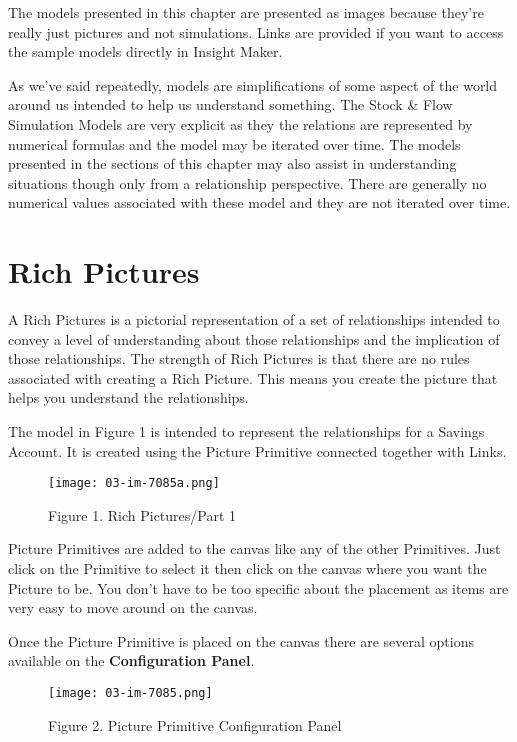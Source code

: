 \documentclass[]{memoir}
\let\Oldincludegraphics\includegraphics
\renewcommand{\includegraphics}[1]{\Oldincludegraphics[max size={\textwidth}{\textheight}]{#1}}
\renewcommand{\u}[1]{\textbf{#1}}
\begin{document}
The models presented in this chapter are presented as images because
they're really just pictures and not simulations. Links are provided if
you want to access the sample models directly in Insight Maker.

As we've said repeatedly, models are simplifications of some aspect of
the world around us intended to help us understand something. The Stock
\& Flow Simulation Models are very explicit as they the relations are
represented by numerical formulas and the model may be iterated over
time. The models presented in the sections of this chapter may also
assist in understanding situations though only from a relationship
perspective. There are generally no numerical values associated with
these model and they are not iterated over time.

\section{Rich Pictures}

A Rich Pictures is a pictorial representation of a set of relationships
intended to convey a level of understanding about those relationships
and the implication of those relationships. The strength of Rich
Pictures is that there are no rules associated with creating a Rich
Picture. This means you create the picture that helps you understand the
relationships.

The model in Figure 1 is intended to represent the relationships for a
Savings Account. It is created using the Picture Primitive connected
together with Links.

\begin{figure}[htbp]
\centering
\texttt{[image: 03-im-7085a.png]}
\caption{Figure 1. Rich Pictures/Part 1}
\end{figure}

Picture Primitives are added to the canvas like any of the other
Primitives. Just click on the Primitive to select it then click on the
canvas where you want the Picture to be. You don't have to be too
specific about the placement as items are very easy to move around on
the canvas.

Once the Picture Primitive is placed on the canvas there are several
options available on the \u{Configuration Panel}.

\begin{figure}[htbp]
\centering
\texttt{[image: 03-im-7085.png]}
\caption{Figure 2. Picture Primitive Configuration Panel}
\end{figure}
\end{document}
